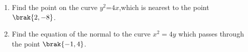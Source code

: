 \begin{enumerate}
\item Find the point on the curve $y^2$=$4x$,which is nearest to the point $\brak{2,-8}$.  
\item Find the equation of the normal to the curve ${x}^2 = 4y$ which passes through the point $\brak{-1, 4}$.
\end{enumerate}
